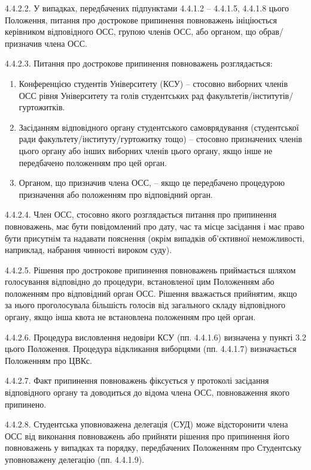         4.4.2.2. У випадках, передбачених підпунктами 4.4.1.2 – 4.4.1.5, 4.4.1.8 цього Положення, питання про дострокове припинення повноважень ініціюється керівником відповідного ОСС, групою членів ОСС, або органом, що обрав/призначив члена ОСС.

        4.4.2.3. Питання про дострокове припинення повноважень розглядається:

            \begin{enumerate}[label=\alph*)]
                \item Конференцією студентів Університету (КСУ) – стосовно виборних членів ОСС рівня Університету та голів студентських рад факультетів/інститутів/гуртожитків.
                \item Засіданням відповідного органу студентського самоврядування (студентської ради факультету/інституту/гуртожитку тощо) – стосовно призначених членів цього органу або інших виборних членів цього органу, якщо інше не передбачено положенням про цей орган.
                \item Органом, що призначив члена ОСС, – якщо це передбачено процедурою призначення або положенням про відповідний орган.
            \end{enumerate}

        4.4.2.4. Член ОСС, стосовно якого розглядається питання про припинення повноважень, має бути повідомлений про дату, час та місце засідання і має право бути присутнім та надавати пояснення (окрім випадків об'єктивної неможливості, наприклад, набрання чинності вироком суду).

        4.4.2.5. Рішення про дострокове припинення повноважень приймається шляхом голосування відповідно до процедури, встановленої цим Положенням або положенням про відповідний орган ОСС. Рішення вважається прийнятим, якщо за нього проголосувала більшість голосів від загального складу відповідного органу, якщо інша квота не встановлена положенням про цей орган.

        4.4.2.6. Процедура висловлення недовіри КСУ (пп. 4.4.1.6) визначена у пункті 3.2 цього Положення. Процедура відкликання виборцями (пп. 4.4.1.7) визначається Положенням про ЦВКс.

        4.4.2.7. Факт припинення повноважень фіксується у протоколі засідання відповідного органу та доводиться до відома члена ОСС, повноваження якого припинено.

        4.4.2.8. Студентська уповноважена делегація (СУД) може відсторонити члена ОСС від виконання повноважень або прийняти рішення про припинення його повноважень у випадках та порядку, передбачених Положенням про Студентську уповноважену делегацію (пп. 4.4.1.9).

